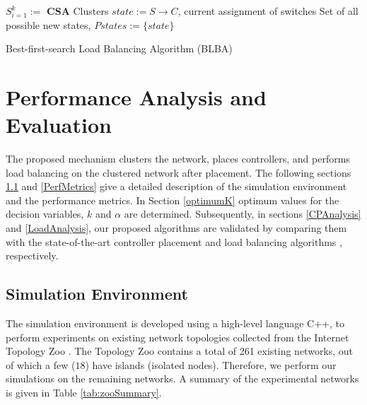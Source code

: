 \documentclass[final,5p,times]{cas-dc}
\begin{document}
	\begin{algorithm}
		\SetAlgoLined
		$S_{i=1}^k := $ \textbf{CSA} Clusters\;
		$state := S \rightarrow C$, current assignment of switches\;
		Set of all possible new states, $Pstates := \{state\}$\;
		\caption{Best-first-search Load Balancing Algorithm (BLBA)} \label{algo:blb}
	\end{algorithm}
	
	\section{Performance Analysis and Evaluation} \label{simulations}
	
	The proposed mechanism clusters the network, places controllers, and performs load balancing on the clustered network after placement. The following sections \ref{SimEnv} and \ref{PerfMetrics} give a detailed description of the simulation environment and the performance metrics. In Section \ref{optimumK} optimum values for the decision variables, $k$ and $\alpha$ are determined. Subsequently, in sections \ref{CPAnalysis} and \ref{LoadAnalysis}, our proposed algorithms are validated by comparing them with the state-of-the-art controller placement \cite{dbcp2017} and load balancing algorithms \cite{filali2018sdn}, respectively.
	
	\subsection{Simulation Environment} \label{SimEnv}
	The simulation environment is developed using a high-level language C++, to perform experiments on existing network topologies collected from the Internet Topology Zoo \cite{knight2011internet}. The Topology Zoo contains a total of 261 existing networks, out of which a few ($18$) have islands (isolated nodes). Therefore, we perform our simulations on the remaining networks. A summary of the experimental networks is given in Table \ref{tab:zooSummary}.
	
\end{document}
